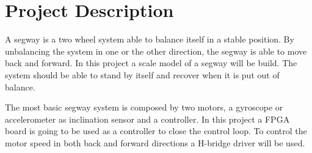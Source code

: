 \section*{Project Description}

A segway is a two wheel system able to balance itself in a stable position. 
By unbalancing the system in one or the other direction, the segway is able to move back and forward.
In this project a scale model of a segway will be build.
The system should be able to stand by itself and recover when it is put out of balance.

The most basic segway system is composed by two motors, a gyroscope or accelerometer as inclination sensor and a controller.
In this project a FPGA board is going to be used as a controller to close the control loop.
To control the motor speed in both back and forward directions a H-bridge driver will be used.




